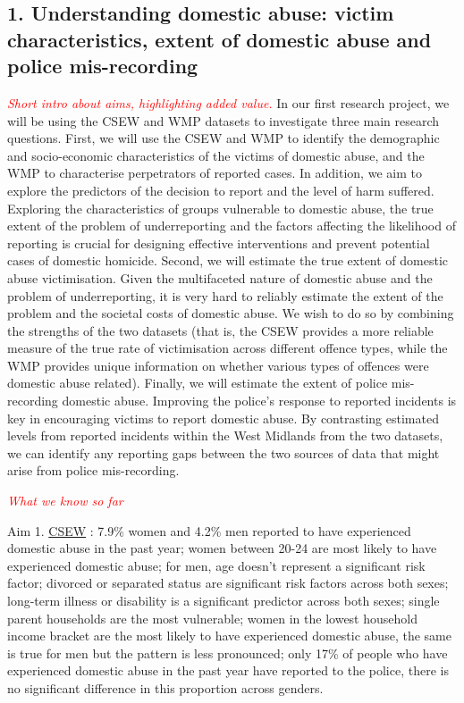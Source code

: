 \documentclass[11pt, a4paper]{article}
\begin{document}
\subsection*{1. Understanding domestic abuse: victim characteristics, extent of domestic abuse and police mis-recording}

 \textcolor{red}{\textit{Short intro about aims, highlighting added value.}}
In our first research project, we will be using the CSEW and WMP datasets to investigate three main research questions. First, we will use the CSEW and WMP to identify the demographic and socio-economic characteristics of the victims of domestic abuse, and the WMP to characterise perpetrators of reported cases. In addition, we aim to explore the predictors of the decision to report and the level of harm suffered. Exploring the characteristics of groups vulnerable to domestic abuse, the true extent of the problem of underreporting and the factors affecting the likelihood of reporting is crucial for designing effective interventions and prevent potential cases of domestic homicide. Second, we will estimate the true extent of domestic abuse victimisation. Given the multifaceted nature of domestic abuse and the problem of underreporting, it is very hard to reliably estimate the extent of the problem and the societal costs of domestic abuse. We wish to do so by combining the strengths of the two datasets (that is, the CSEW provides a more reliable measure of the true rate of victimisation across different offence types, while the WMP provides unique information on whether various types of offences were domestic abuse related). Finally, we will estimate the extent of police mis-recording domestic abuse. Improving the police's response to reported incidents is key in encouraging victims to report domestic abuse. By contrasting estimated levels from reported incidents within the West Midlands from the two datasets, we can identify any reporting gaps between the two sources of data that might arise from police mis-recording.

\textcolor{red}{\textit{What we know so far}} 

Aim 1. \href{https://www.ons.gov.uk/peoplepopulationandcommunity/crimeandjustice/articles/domesticabusefindingsfromthecrimesurveyforenglandandwales/yearendingmarch2018}{CSEW} : 7.9\% women and 4.2\% men reported to have experienced domestic abuse in the past year; women between 20-24 are most likely to have experienced domestic abuse; for men, age doesn't represent a significant risk factor;  divorced or separated status are significant risk factors across both sexes; long-term illness or disability is a significant predictor across both sexes; single parent households are the most vulnerable; women in the lowest household income bracket are the most likely to have experienced domestic abuse, the same is true for men but the pattern is less pronounced; only 17\% of people who have experienced domestic abuse in the past year have reported to the police, there is no significant difference in this proportion across genders.   
\end{document}
